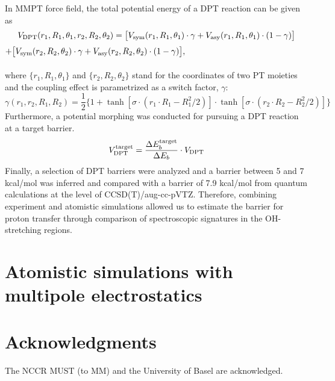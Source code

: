 \documentclass[journal=jacsat,manuscript=article]{achemso}
\begin{document}
In MMPT force field, the total potential energy of a DPT reaction can be given as
\begin{equation}
V_{\rm DPT} (r_1,R_1,\theta_1,r_2,R_2,\theta_2)=\big[V_{\rm 
sym}(r_1,R_1,\theta_1)\cdot\gamma+V_{\rm asy}(r_1,R_1,\theta_1)\cdot(1-\gamma)\big]
\label{eq:edpt}
\end{equation}
{\centering$ +\big[V_{\rm sym}(r_2,R_2,\theta_2)\cdot\gamma+V_{\rm asy}(r_2,R_2,\theta_2)\cdot(1-\gamma)\big], $}
\\
\\
\noindent
where $ \{r_1,R_1,\theta_1\} $ and $ \{r_2,R_2,\theta_2\} $ stand for the coordinates of two PT moieties and the coupling effect is parametrized as a switch factor, $ \gamma $:
\begin{equation}
\gamma(r_1,r_2,R_1,R_2)=\frac{1}{2}\big\{1+\tanh[\sigma\cdot(r_1\cdot
  R_1-R_1^2/2)]\cdot\tanh[\sigma\cdot(r_2\cdot R_2-R_2^2/2)]\big\}
\label{eq:gamma}
\end{equation}
\noindent
Furthermore, a potential morphing was conducted for pursuing a DPT reaction at a target barrier.
\begin{equation}
V_{\rm DPT}^{\rm target}=\frac{\Delta E_b^{\rm target}}{\Delta E_b}\cdot V_{\rm DPT}
\label{eq:morph}
\end{equation}
Finally, a selection of DPT barriers were analyzed and a barrier between 5 and 7 kcal/mol was inferred and compared with a barrier of 7.9 kcal/mol from quantum calculations at the level of CCSD(T)/aug-cc-pVTZ.
Therefore, combining experiment and atomistic simulations allowed us to estimate
the barrier for proton transfer through comparison of spectroscopic signatures in the OH-stretching regions. 


\section{Atomistic simulations with multipole electrostatics}
    
\section*{Acknowledgments}
The NCCR MUST (to MM) and the University of Basel are acknowledged.



\end{document}
